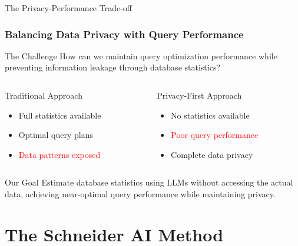 \documentclass{beamer}
\begin{document}
\begin{frame}{The Privacy-Performance Trade-off}
\frametitle{Balancing Data Privacy with Query Performance}

\begin{block}{The Challenge}
How can we maintain query optimization performance while preventing information leakage through database statistics?
\end{block}

\vspace{0.5cm}

\begin{columns}[T]
\begin{column}{0.5\textwidth}
\begin{exampleblock}{Traditional Approach}
\begin{itemize}
    \item Full statistics available
    \item Optimal query plans
    \item \textcolor{red}{Data patterns exposed}
\end{itemize}
\end{exampleblock}
\end{column}

\begin{column}{0.5\textwidth}
\begin{exampleblock}{Privacy-First Approach}
\begin{itemize}
    \item No statistics available
    \item \textcolor{red}{Poor query performance}
    \item Complete data privacy
\end{itemize}
\end{exampleblock}
\end{column}
\end{columns}

\vspace{0.5cm}

\begin{alertblock}{Our Goal}
Estimate database statistics using LLMs without accessing the actual data, achieving near-optimal query performance while maintaining privacy.
\end{alertblock}

\end{frame}

\section{The Schneider AI Method}
\end{document}
